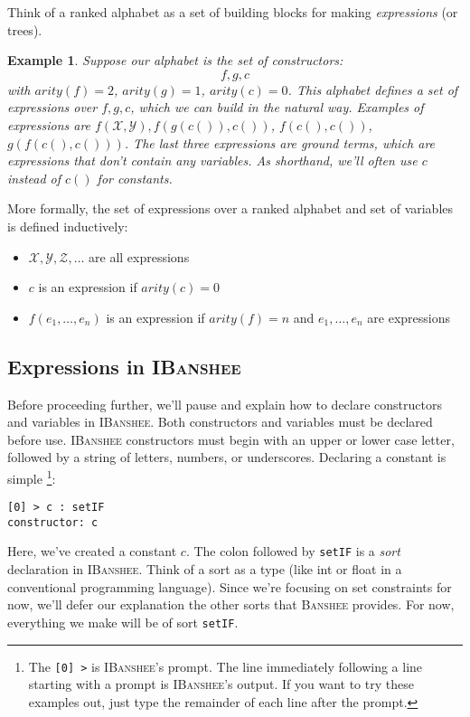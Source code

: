 \documentclass[10pt]{article}
\newcommand{\banshee}{\textsc{Banshee}}
\newcommand{\ibanshee}{\textsc{IBanshee}}
\newcommand{\var}[1]{\mathcal{#1}}
\newtheorem{example}{Example}
\begin{document}
Think of a ranked alphabet as a set of building blocks for making
\emph{expressions} (or trees). 

\begin{example}
Suppose our alphabet is the set of constructors:
\[
f,g,c
\]
with $arity(f) =2$, $arity(g) = 1$, $arity(c) = 0$. This alphabet
defines a set of expressions over $f,g,c$, which we can build in the
natural way. Examples of expressions are $f(\var{X},\var{Y}),
f(g(c()),c())$, $f(c(),c())$, $g(f(c(),c()))$. The last three
expressions are \emph{ground terms}, which are expressions that don't
contain any variables. As shorthand, we'll often use $c$ instead of
$c()$ for constants.
\end{example}

More formally, the set of expressions over a ranked alphabet and set of
variables is defined inductively:
\begin{itemize}
\item $\var{X},\var{Y},\var{Z},\ldots$ are all expressions
\item $c$ is an expression if $arity(c) = 0$
\item $f(e_1,\ldots,e_n)$ is an expression if $arity(f) = n$ and
  $e_1,\ldots,e_n$ are expressions
\end{itemize}

\subsection{Expressions in \ibanshee{}}

Before proceeding further, we'll pause and explain how to declare
constructors and variables in \ibanshee{}. Both constructors and
variables must be declared before use. \ibanshee{} constructors must
begin with an upper or lower case letter, followed by a string of
letters, numbers, or underscores. Declaring a constant is
simple \footnote{The \texttt{[0] >} is \ibanshee{}'s prompt. The line
  immediately following a line starting with a prompt is \ibanshee{}'s
  output. If you want to try these examples out, just type the
  remainder of each line after the prompt.}:

\begin{verbatim}
[0] > c : setIF
constructor: c
\end{verbatim}
Here, we've created a constant $c$. The colon followed by
\texttt{setIF} is a \emph{sort} declaration in \ibanshee{}. Think of a
sort as a type (like int or float in a conventional programming
language). Since we're focusing on set constraints for now, we'll
defer our explanation the other sorts that \banshee{} provides. For
now, everything we make will be of sort \texttt{setIF}.
\end{document}
